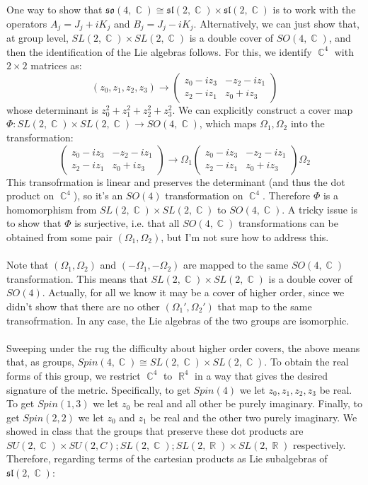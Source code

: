\documentclass[12 pt]{article}
\DeclareMathOperator {\R} {\mathbb{R}}
\DeclareMathOperator {\C} {\mathbb{C}}
\begin{document}
One way to show that $\mathfrak{so}(4,\C) \cong \mathfrak{sl}(2,\C) \times \mathfrak{sl}(2,\C)$ is to work with the operators $A_j = J_j + i K_j$ and $B_j = J_j - i K_j$. Alternatively, we can just show that, at group level, $SL(2,\C) \times SL(2,\C)$ is a double cover of $SO(4,\C)$, and then the identification of the Lie algebras follows. For this, we identify $\C^4$ with $2\times 2$ matrices as:
\[            (z_0, z_1, z_2, z_3)  \to  \left( \begin{array}  {cc}   z_0 - iz_3 & -z_2 - iz_1  \\  z_2 - iz_1 & z_0 + iz_3    \end{array} \right)  \]
 whose determinant is $z_0^2+z_1^2+z_2^2+z_3^2$. We can explicitly construct a cover map $\Phi: SL(2,\C) \times SL(2,\C) \to SO(4,\C)$, which maps $\Omega_1, \Omega_2$ into the transformation:
\[   \left( \begin{array}  {cc}   z_0 - iz_3 & -z_2 - iz_1  \\  z_2 - iz_1 & z_0 + iz_3    \end{array} \right)  \to \Omega_1   \left( \begin{array}  {cc}   z_0 - iz_3 & -z_2 - iz_1  \\  z_2 - iz_1 & z_0 + iz_3    \end{array} \right)  \Omega_2                 \]
This transofrmation is linear and preserves the determinant (and thus the dot product on $\C^4$), so it's an $SO(4)$ transformation on $\C^4$. Therefore $\Phi$ is a homomorphism from $SL(2,\C) \times SL(2,\C)$ to $SO(4,\C)$. A tricky issue is to show that $\Phi$ is surjective, i.e. that all $SO(4,\C)$ transformations can be obtained from some pair $(\Omega_1, \Omega_2)$, but I'm not sure how to address this.
\\
\\
Note that $(\Omega_1, \Omega_2)$ and $(-\Omega_1, -\Omega_2)$ are mapped to the same $SO(4,\C)$ transformation. This means that $SL(2,\C) \times SL(2,\C)$ is a double cover of $SO(4)$. Actually, for all we know it may be a cover of higher order, since we didn't show that there are no other $(\Omega_1', \Omega_2')$ that map to the same transofrmation. In any case, the Lie algebras of the two groups are isomorphic.
\\
\\
Sweeping under the rug the difficulty about higher order covers, the above means that, as groups, $Spin(4, \C) \cong SL(2,\C) \times SL(2,\C)$. To obtain the real forms of this group, we restrict $\C^4$ to $\R^4$ in a way that gives the desired signature of the metric. Specifically, to get $Spin(4)$ we let $z_0, z_1, z_2, z_3$ be real. To get $Spin(1,3)$ we let $z_0$ be real and all other be purely imaginary. Finally, to get $Spin(2,2)$ we let $z_0$ and $z_1$ be real and the other two purely imaginary. We showed in class that the groups that preserve these dot products are $SU(2,\C) \times SU(2,C) ; SL(2,\C) ; SL(2,\R)\times SL(2,\R)$ respectively. Therefore, regarding terms of the cartesian products as Lie subalgebras of $\mathfrak{sl}(2,\C)$:
\end{document}
